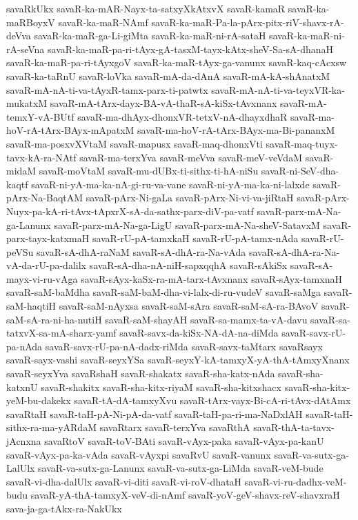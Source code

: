 {savaRkUkx
savaR-ka-mAR-Nayx-ta-satxyXkAtxvX
savaR-kamaR
savaR-ka-maRBoyxV
savaR-ka-maR-NAmf
savaR-ka-maR-Pa-la-pArx-pitx-riV-shavx-rA-deVva
savaR-ka-maR-ga-Li-giMta
savaR-ka-maR-ni-rA-sataH
savaR-ka-maR-ni-rA-seVna
savaR-ka-maR-pa-ri-tAyx-gA-tasxM-tayx-kAtx-sheV-Sa-sA-dhanaH
savaR-ka-maR-pa-ri-tAyxgoV
savaR-ka-maR-tAyx-ga-vanunx
savaR-kaq-cAcxsw
savaR-ka-taRnU
savaR-loVka
savaR-mA-da-dAnA
savaR-mA-kA-shAnatxM
savaR-mA-nA-ti-va-tAyxR-tamx-parx-ti-patwtx
savaR-mA-nA-ti-va-teyxVR-ka-mukatxM
savaR-mA-tArx-dayx-BA-vA-thaR-sA-kiSx-tAvxnanx
savaR-mA-temxY-vA-BUtf
savaR-ma-dhAyx-dhonxVR-tetxV-nA-dhayxdhaR
savaR-ma-hoV-rA-tArx-BAyx-mApatxM
savaR-ma-hoV-rA-tArx-BAyx-ma-Bi-pananxM
savaR-ma-posxvXVtaM
savaR-mapusx
savaR-maq-dhonxVti
savaR-maq-tuyx-tavx-kA-ra-NAtf
savaR-ma-terxYva
savaR-meVva
savaR-meV-veVdaM
savaR-midaM
savaR-moVtaM
savaR-mu-dUBx-ti-sithx-ti-hA-niSu
savaR-ni-SeV-dha-kaqtf
savaR-ni-yA-ma-ka-nA-gi-ru-va-vane
savaR-ni-yA-ma-ka-ni-lalxde
savaR-pArx-Na-BaqtAM
savaR-pArx-Ni-gaLa
savaR-pArx-Ni-vi-va-jiRtaH
savaR-pArx-Nuyx-pa-kA-ri-tAvx-tApxrX-sA-da-sathx-parx-diV-pa-vatf
savaR-parx-mA-Na-ga-Lanunx
savaR-parx-mA-Na-ga-LigU
savaR-parx-mA-Na-sheV-SatavxM
savaR-parx-tayx-katxmaH
savaR-rU-pA-tamxkaH
savaR-rU-pA-tamx-nAda
savaR-rU-peVSu
savaR-sA-dhA-raNaM
savaR-sA-dhA-ra-Na-vAda
savaR-sA-dhA-ra-Na-vA-da-rU-pa-dalilx
savaR-sA-dha-nA-niH-sapxqqhA
savaR-sAkiSx
savaR-sA-mayx-vi-ru-vAga
savaR-sAyx-kaSx-ra-mA-tarx-tAvxnanx
savaR-sAyx-tamxnaH
savaR-saM-baMdha
savaR-saM-baM-dha-vi-lalx-di-ru-vudeV
savaR-saMga
savaR-saM-haqtiH
savaR-saM-nAyxsa
savaR-saM-sAra
savaR-saM-sA-ra-BAvoV
savaR-saM-sA-ra-ni-ha-nutiH
savaR-saM-shayAH
savaR-sa-mamx-ta-vA-davu
savaR-sa-tatxvX-sa-mA-sharx-yamf
savaR-savx-da-kiSx-NA-dA-na-diMda
savaR-savx-rU-pa-nAda
savaR-savx-rU-pa-nA-dadx-riMda
savaR-savx-taMtarx
savaRsayx
savaR-sayx-vashi
savaR-seyxYSa
savaR-seyxY-kA-tamxyX-yA-thA-tAmxyXnanx
savaR-seyxYva
savaRshaH
savaR-shakatx
savaR-sha-katx-nAda
savaR-sha-katxnU
savaR-shakitx
savaR-sha-kitx-riyaM
savaR-sha-kitxshacx
savaR-sha-kitx-yeM-bu-dakekx
savaR-tA-dA-tamxyXvu
savaR-tArx-vayx-Bi-cA-ri-tAvx-dAtAmx
savaRtaH
savaR-taH-pA-Ni-pA-da-vatf
savaR-taH-pa-ri-ma-NaDxlAH
savaR-taH-sithx-ra-ma-yARdaM
savaRtarx
savaR-terxYva
savaRthA
savaR-thA-ta-tavx-jAcnxna
savaRtoV
savaR-toV-BAti
savaR-vAyx-paka
savaR-vAyx-pa-kanU
savaR-vAyx-pa-ka-vAda
savaR-vAyxpi
savaRvU
savaR-vanunx
savaR-va-sutx-ga-LalUlx
savaR-va-sutx-ga-Lanunx
savaR-va-sutx-ga-LiMda
savaR-veM-bude
savaR-vi-dha-dalUlx
savaR-vi-diti
savaR-vi-roV-dhataH
savaR-vi-ru-dadhx-veM-budu
savaR-yA-thA-tamxyX-veV-di-nAmf
savaR-yoV-geV-shavx-reV-shavxraH
sava-ja-ga-tAkx-ra-NakUkx
}
